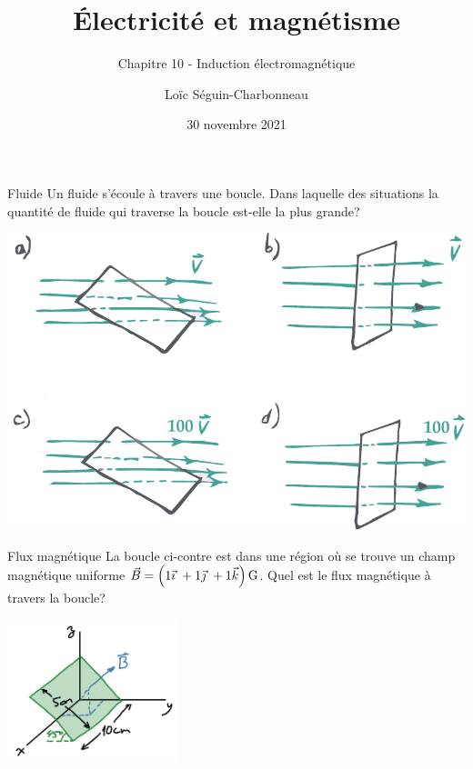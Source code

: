 \documentclass{beamer}
\title{Électricité et magnétisme}
\subtitle{Chapitre 10 - Induction électromagnétique}
\date{30 novembre 2021}
\author{Loïc Séguin-Charbonneau}
\institute{Cégep Édouard-Montpetit}
\begin{document}
\maketitle

\begin{frame}{Fluide}
  Un fluide s'écoule à travers une boucle. Dans laquelle des situations la
  quantité de fluide qui traverse la boucle est-elle la plus grande?

  \begin{center}
    \includegraphics[scale=0.8]{figures/flux.pdf}
  \end{center}
\end{frame}


\begin{frame}{Flux magnétique}
  La boucle ci-contre est dans une région où se trouve un champ magnétique
  uniforme $\vB = \left(\vecxyz{1}{1}{1}\right) \si{G}$. Quel est le flux
  magnétique à travers la boucle?
    \begin{center}
      \includegraphics[width=5cm]{figures/flux-boucle-1.png}
    \end{center}
\end{frame}
\end{document}
